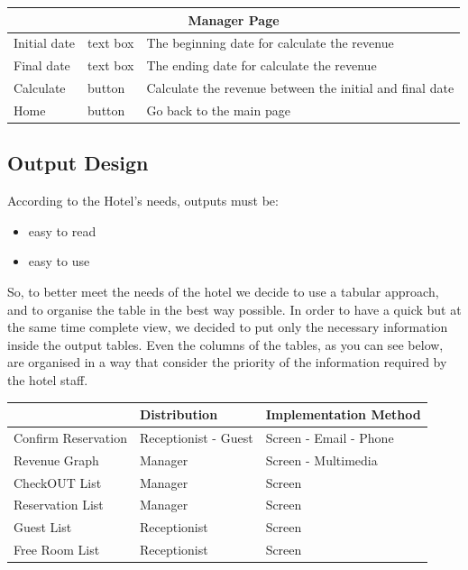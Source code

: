 \begin{center}
\begin{longtable}{| l | l | p{7cm} |}
	\hline \hline
	\multicolumn{3}{|c|}{\textbf{Manager Page}} \\
	\hline	\hline
	Initial date	& text box		& The beginning date for calculate the revenue \\
	Final date		& text box		& The ending date for calculate the revenue \\
	Calculate		& button		& Calculate the revenue between the initial and final date \\
	Home			& button		& Go back to the main page \\
	\hline
	\end{longtable}
\end{center}

\subsection{Output Design}

According to the Hotel’s needs, outputs must be:

\begin{itemize}
  \item easy to read
  \item easy to use
\end{itemize}

So, to better meet the needs of the hotel we decide to use a tabular approach, and to organise the table in the best way possible. In order to have a quick but at the same time complete view, we decided to put only the necessary information inside the output tables. Even the columns of the tables, as you can see below, are organised in a way that consider the priority of the information required by the hotel staff. 

\begin{table}[h]
\begin{tabular}{|l|l|l|}
\hline
                    & Distribution         & Implementation Method  \\ \hline
Confirm Reservation & Receptionist - Guest & Screen - Email - Phone \\ \hline
Revenue Graph       & Manager              & Screen - Multimedia    \\ \hline
CheckOUT List       & Manager              & Screen                 \\ \hline
Reservation List    & Manager              & Screen                 \\ \hline
Guest List          & Receptionist         & Screen                 \\ \hline
Free Room List      & Receptionist         & Screen                 \\ \hline
\end{tabular}
\end{table}


